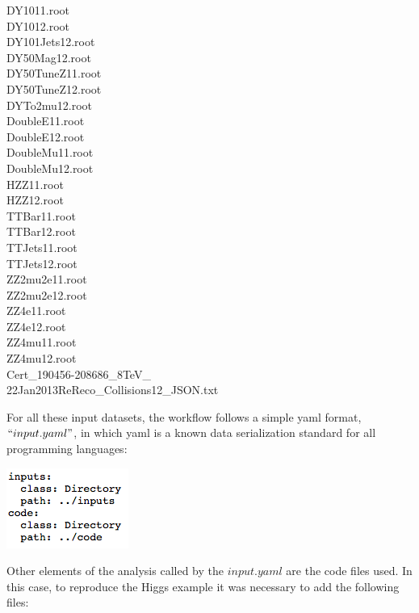 \documentclass[letter]{article}
\newcommand\tab[1][1cm]{\hspace*{#1}}
\begin{document}
\begin{small}
\begin{multicols}{2}
\hspace{14pt}DY1011.root 
\\\tab DY1012.root
\\\tab DY101Jets12.root
\\\tab DY50Mag12.root
\\\tab DY50TuneZ11.root
\\\tab DY50TuneZ12.root
\\\tab DYTo2mu12.root
\\\tab DoubleE11.root
\\\tab DoubleE12.root
\\\tab DoubleMu11.root
\\\tab DoubleMu12.root
\\\tab HZZ11.root
\\\tab HZZ12.root
\\\tab TTBar11.root
\\\tab TTBar12.root
\\\tab TTJets11.root
\\\tab TTJets12.root
\\\tab ZZ2mu2e11.root
\\\tab ZZ2mu2e12.root
\\\tab ZZ4e11.root
\\\tab ZZ4e12.root
\\\tab ZZ4mu11.root
\\\tab ZZ4mu12.root
\\\tab Cert\_190456-208686\_8TeV\_\\\tab 22Jan2013ReReco\_Collisions12\_JSON.txt
\end{multicols} 
\end{small}
\vspace{20pt}
\hspace{-18pt} For all these input datasets, the workflow follows a simple yaml format,$``input.yaml"$, in which yaml is a known data serialization standard for all programming languages\cite{yaml}:
\begin{center}
\includegraphics[scale=0.6]{inputs}
\end{center}
Other elements of the analysis called by the $input.yaml$ are the code files used. In this case, to reproduce the Higgs example it was necessary to add the following files: 
\end{document}
